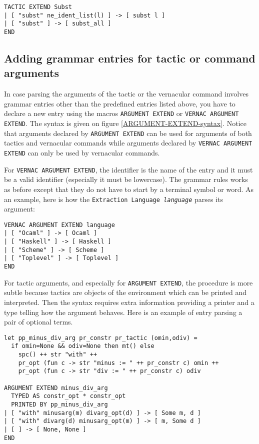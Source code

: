 \begin{verbatim}
TACTIC EXTEND Subst
| [ "subst" ne_ident_list(l) ] -> [ subst l ]
| [ "subst" ] -> [ subst_all ]
END
\end{verbatim}

\subsection{Adding grammar entries for tactic or command arguments}

In case parsing the arguments of the tactic or the vernacular command
involves grammar entries other than the predefined entries listed
above, you have to declare a new entry using the macros
\verb=ARGUMENT EXTEND= or \verb=VERNAC ARGUMENT EXTEND=. The syntax is
given on figure \ref{ARGUMENT-EXTEND-syntax}. Notice that arguments
declared by \verb=ARGUMENT EXTEND= can be used for arguments of both
tactics and vernacular commands while arguments declared by
\verb=VERNAC ARGUMENT EXTEND= can only be used by vernacular commands.

For \verb=VERNAC ARGUMENT EXTEND=, the identifier is the name of the
entry and it must be a valid {\ocaml} identifier (especially it must
be lowercase).  The grammar rules works as before except that they do
not have to start by a terminal symbol or word.  As an example, here
is how the {\Coq} {\tt Extraction Language {\it language}} parses its
argument:

\begin{verbatim}
VERNAC ARGUMENT EXTEND language
| [ "Ocaml" ] -> [ Ocaml ]
| [ "Haskell" ] -> [ Haskell ]
| [ "Scheme" ] -> [ Scheme ]
| [ "Toplevel" ] -> [ Toplevel ]
END
\end{verbatim}

For tactic arguments, and especially for \verb=ARGUMENT EXTEND=, the
procedure is more subtle because tactics are objects of the {\Coq}
environment which can be printed and interpreted. Then the syntax
requires extra information providing a printer and a type telling how
the argument behaves. Here is an example of entry parsing a pair of
optional {\Coq} terms.

\begin{verbatim}
let pp_minus_div_arg pr_constr pr_tactic (omin,odiv) = 
  if omin=None && odiv=None then mt() else
    spc() ++ str "with" ++
    pr_opt (fun c -> str "minus := " ++ pr_constr c) omin ++
    pr_opt (fun c -> str "div := " ++ pr_constr c) odiv

ARGUMENT EXTEND minus_div_arg 
  TYPED AS constr_opt * constr_opt
  PRINTED BY pp_minus_div_arg
| [ "with" minusarg(m) divarg_opt(d) ] -> [ Some m, d ]
| [ "with" divarg(d) minusarg_opt(m) ] -> [ m, Some d ]
| [ ] -> [ None, None ]
END
\end{verbatim}

